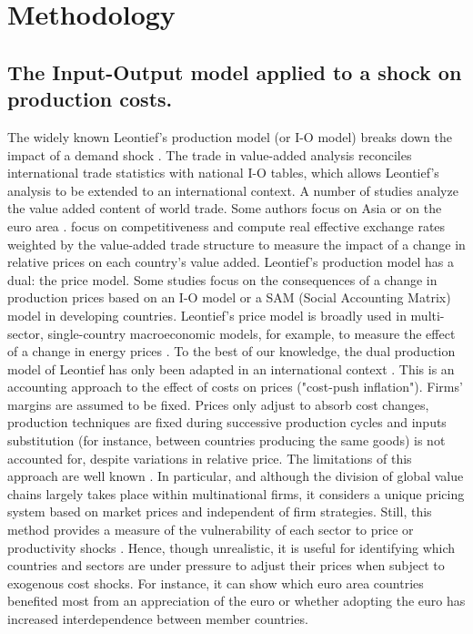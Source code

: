 \documentclass[11pt,a4paper]{article}
\begin{document}
\section{Methodology }
\label{sec:metho}

\subsection{The Input-Output model applied to a shock on production costs.}
\label{subsec:io}
The widely known Leontief's production model (or I-O model) breaks down the impact of a demand shock \citep{Leontief1951}. The trade in value-added analysis reconciles international trade statistics with national I-O tables, which allows Leontief's analysis to be extended to an international context. A number of studies \citep{Hummels2001,Daudin2006,Daudin2011, DeBacker2012,Johnson2012,Koopman2014, Amador2015,Los2016} analyze the value added content of world trade. Some authors focus on Asia \citep{Sato2014} or on the euro area \citep{Cappariello2015}. \cite{Bems2015} focus on competitiveness and compute real effective exchange rates weighted by the value-added trade structure to measure the impact of a change in relative prices on each country's value added.
Leontief's production model has a dual: the price model. Some studies focus on the consequences of a change in production prices based on an I-O model or a SAM (Social Accounting Matrix) model in developing countries. Leontief's price model is broadly used in multi-sector, single-country macroeconomic models, for example, to measure the effect of a change in energy prices \citep{Bournay2015, Sharify2013}. To the best of our knowledge, the dual production model of Leontief has only been adapted in an international context \cite{Cochard2016}. 
This is an accounting approach to the effect of costs on prices ("cost-push inflation"). Firms' margins are assumed to be fixed. Prices only adjust to absorb cost changes, production techniques are fixed during successive production cycles and inputs substitution (for instance, between countries producing the same goods) is not accounted for, despite variations in relative price. The limitations of this approach are well known \citep{Folloni1994}. In particular, and although the division of global value chains largely takes place within multinational firms, it considers a unique pricing system based on market prices and independent of firm strategies. Still, this method provides a measure of the vulnerability of each sector to price or productivity shocks \citep{Acemoglu2012,Carvalho2014}. Hence, though unrealistic, it is useful for identifying which countries and sectors are under pressure to adjust their prices when subject to exogenous cost shocks. For instance, it can show which euro area countries benefited most from an appreciation of the euro or whether adopting the euro has increased interdependence between member countries.
\end{document}
